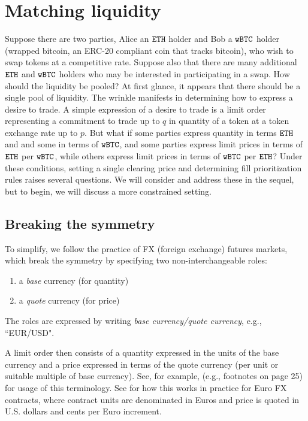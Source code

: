 \documentclass[11pt, reqno]{amsart}
\theoremstyle{definition}
\theoremstyle{remark}
\newcommand{\BTC}{\textnormal{\texttt{wBTC}}}
\newcommand{\ETH}{\textnormal{\texttt{ETH}}}
\begin{document}
\section{Matching liquidity}
Suppose there are two parties, Alice an $\ETH$ holder and Bob a $\BTC$ holder
(wrapped bitcoin, an ERC-20 compliant coin that tracks bitcoin), who wish to
swap tokens at a competitive rate. Suppose also that there are many
additional $\ETH$ and $\BTC$ holders who may be interested in participating in a
swap. How should the liquidity be pooled? At first glance, it appears that
there should be a single pool of liquidity. The wrinkle manifests in determining
how to express a desire to trade. A simple expression of a desire to trade is
a limit order representing a commitment to trade up to $q$ in quantity of
a token at a token exchange rate up to $p$. But what if some parties express
quantity in terms $\ETH$ and and some in terms of $\BTC$, and some parties
express limit prices in terms of $\ETH$ per $\BTC$, while others express limit
prices in terms of $\BTC$ per $\ETH$? Under these conditions, setting a single
clearing price and determining fill prioritization rules raises several
questions. We will consider and address these in the sequel, but to begin, we
will discuss a more constrained setting.

\subsection{Breaking the symmetry}
To simplify, we follow the practice of FX (foreign exchange) futures markets,
which break the symmetry by specifying two non-interchangeable roles:
\begin{enumerate}
	\item a \emph{base} currency (for quantity)
	\item a \emph{quote} currency (for price)
\end{enumerate}
The roles are expressed by writing \emph{base currency/quote currency}, e.g.,
``EUR/USD".

A limit order then consists of a quantity expressed in the units of the base
currency and a price expressed in terms of the quote currency (per unit or
suitable multiple of base currency). See, for example, \cite{Cme23} (e.g.,
footnotes on page 25) for usage of this terminology. See \cite{CmeFx} for how
this works in practice for Euro FX contracts, where contract units are
denominated in Euros and price is quoted in U.S. dollars and cents per Euro
increment.
\end{document}
